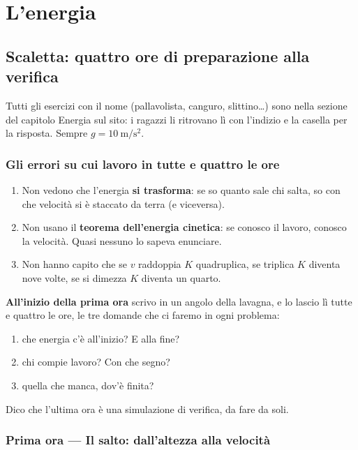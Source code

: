 \documentclass[11pt]{report}
\begin{document}
\tableofcontents

\chapter{L'energia}

\section{Scaletta: quattro ore di preparazione alla verifica}

Tutti gli esercizi con il nome (pallavolista, canguro, slittino\dots) sono nella sezione  del capitolo Energia sul sito: i ragazzi li ritrovano lì con l'indizio e la casella per la risposta. Sempre $g=\SI{10}{\metre\per\second\squared}$.

\subsection*{Gli errori su cui lavoro in tutte e quattro le ore}
\begin{enumerate}
  \item Non vedono che l'energia \textbf{si trasforma}: se so quanto sale chi salta, so con che velocità si è staccato da terra (e viceversa).
  \item Non usano il \textbf{teorema dell'energia cinetica}: se conosco il lavoro, conosco la velocità. Quasi nessuno lo sapeva enunciare.
  \item Non hanno capito che se $v$ raddoppia $K$ quadruplica, se triplica $K$ diventa nove volte, se si dimezza $K$ diventa un quarto.
\end{enumerate}

\textbf{All'inizio della prima ora} scrivo in un angolo della lavagna, e lo lascio lì tutte e quattro le ore, le tre domande che ci faremo in ogni problema:
\begin{enumerate}
  \item che energia c'è all'inizio? E alla fine?
  \item chi compie lavoro? Con che segno?
  \item quella che manca, dov'è finita?
\end{enumerate}
Dico che l'ultima ora è una simulazione di verifica, da fare da soli.

\subsection*{Prima ora --- Il salto: dall'altezza alla velocità}
\end{document}
